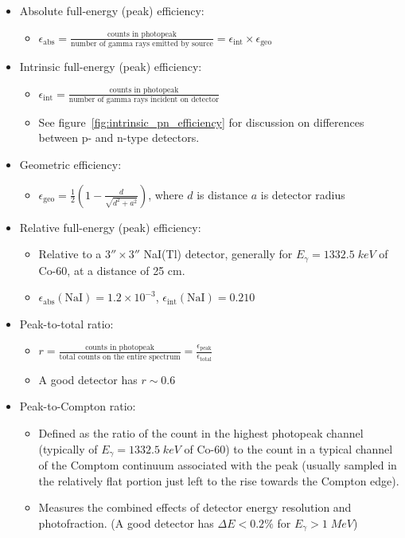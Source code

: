 \begin{enumerate}
    \begin{itemize}
        \item Absolute full-energy (peak) efficiency:
        \begin{itemize}
            \item[] $\epsilon_\text{abs}=\frac{\text{counts in photopeak}}{\text{number of gamma rays emitted by source}}=\epsilon_\text{int}\times\epsilon_\text{geo}$
        \end{itemize}
        \item Intrinsic full-energy (peak) efficiency:
        \begin{itemize}
            \item[] $\epsilon_\text{int}=\frac{\text{counts in photopeak}}{\text{number of gamma rays incident on detector}}$
            \item See figure~\ref{fig:intrinsic_pn_efficiency} for discussion on differences between p- and n-type detectors.
        \end{itemize}
        \item Geometric efficiency:
        \begin{itemize}
            \item[] $\epsilon_\text{geo}=\frac{1}{2}\left(1-\frac{d}{\sqrt{d^2+a^2}}\right)$, where $d$ is distance $a$ is detector radius
        \end{itemize}
        \item Relative full-energy (peak) efficiency:
        \begin{itemize}
            \item Relative to a $3''\times3''$ NaI(Tl) detector, generally for $E_\gamma=1332.5\;keV$ of Co-60, at a distance of 25 cm. 
            \item[] $\epsilon_\text{abs}(\text{NaI})=1.2\times10^{-3}$, $\epsilon_\text{int}(\text{NaI})=0.210$
        \end{itemize}
        \item Peak-to-total ratio:
        \begin{itemize}
            \item[] $r=\frac{\text{counts in photopeak}}{\text{total counts on the entire spectrum}}=\frac{\epsilon_\text{peak}}{\epsilon_\text{total}}$
            \item A good detector has $r\sim0.6$
        \end{itemize}
        \item Peak-to-Compton ratio:
        \begin{itemize}
            \item Defined as the ratio of the count in the highest photopeak channel (typically of $E_\gamma=1332.5\;keV$ of Co-60) to the count in a typical channel of the Comptom continuum associated with the peak (usually sampled in the relatively flat portion just left to the rise towards the Compton edge). 
            \item Measures the combined effects of detector energy resolution and photofraction. (A good detector has $\Delta E<0.2\%$ for $E_\gamma>1\;MeV$)
        \end{itemize}
    \end{itemize}
\end{enumerate}
